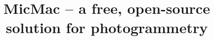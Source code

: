 \documentclass[twocolumn]{bmcart}%
\begin{document}
\begin{frontmatter}

\begin{fmbox}


\title{MicMac -- a free, open-source solution for photogrammetry}



%
%
  


\end{fmbox}
\end{frontmatter}
\end{document}
